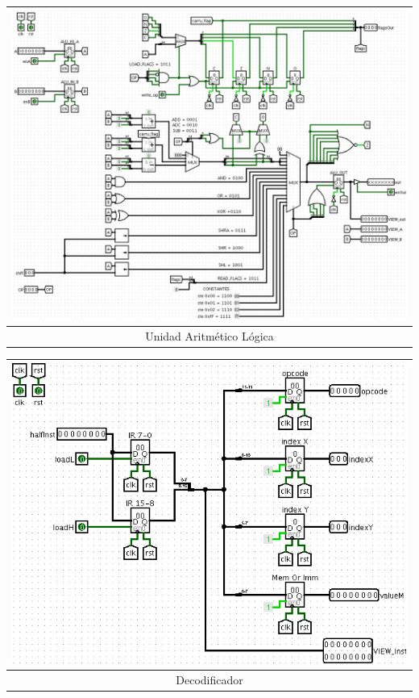 \documentclass[a4paper,11pt]{article}
\begin{document}
\begin{center}
 \begin{tabular}[t]{c}
\includegraphics[scale=1.35]{img/3_ALU.png} \\
\hline
Unidad Aritmético Lógica\\ \hline
\end{tabular}
\end{center}

\newpage

\begin{center}
\begin{tabular}[t]{c}
\includegraphics[scale=0.36]{img/6_Decode.png}\\
\hline
Decodificador\\ \hline
\end{tabular}
\end{center}
\end{document}
